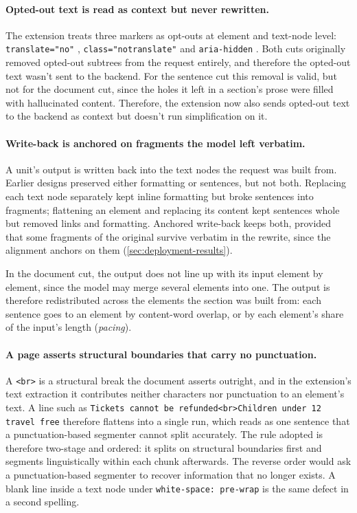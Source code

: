\paragraph{Opted-out text is read as context but never rewritten.}
The extension treats three markers as opt-outs at element and text-node level: \texttt{translate="no"} \parencite{whatwg2026html}, \texttt{class="notranslate"} \parencite{google2008notranslate} and \texttt{aria-hidden} \parencite{w3c2026aria}.
Both cuts originally removed opted-out subtrees from the request entirely, and therefore the opted-out text wasn't sent to the backend.
For the sentence cut this removal is valid, but not for the document cut, since the holes it left in a section's prose were filled with hallucinated content.
Therefore, the extension now also sends opted-out text to the backend as context but doesn't run simplification on it.

\paragraph{Write-back is anchored on fragments the model left verbatim.}
A unit's output is written back into the text nodes the request was built from.
Earlier designs preserved either formatting or sentences, but not both.
Replacing each text node separately kept inline formatting but broke sentences into fragments; flattening an element and replacing its content kept sentences whole but removed links and formatting.
Anchored write-back keeps both, provided that some fragments of the original survive verbatim in the rewrite, since the alignment anchors on them (\cref{sec:deployment-results}).

In the document cut, the output does not line up with its input element by element, since the model may merge several elements into one.
The output is therefore redistributed across the elements the section was built from: each sentence goes to an element by content-word overlap, or by each element's share of the input's length (\emph{pacing}).

\paragraph{A page asserts structural boundaries that carry no punctuation.}
A \texttt{<br>} is a structural break the document asserts outright, and in the extension's text extraction it contributes neither characters nor punctuation to an element's text.
A line such as \texttt{Tickets cannot be refunded<br>Children under 12 travel free} therefore flattens into a single run, which reads as one sentence that a punctuation-based segmenter cannot split accurately.
The rule adopted is therefore two-stage and ordered: it splits on structural boundaries first and segments linguistically within each chunk afterwards.
The reverse order would ask a punctuation-based segmenter to recover information that no longer exists.
A blank line inside a text node under \texttt{white-space: pre-wrap} is the same defect in a second spelling.

